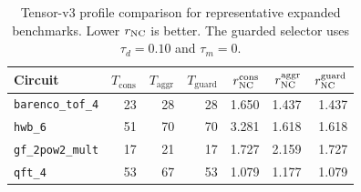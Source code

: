\begin{table}[t]
\caption{Tensor-v3 profile comparison for representative expanded benchmarks. Lower $r_{\mathrm{NC}}$ is better. The guarded selector uses $\tau_d=0.10$ and $\tau_m=0$. }
\label{tab:tensor-v3-guard}
\centering
\small
\begin{tabular}{lrrrrrr}
\toprule
Circuit & $T_{\mathrm{cons}}$ & $T_{\mathrm{aggr}}$ & $T_{\mathrm{guard}}$ & $r_{\mathrm{NC}}^{\mathrm{cons}}$ & $r_{\mathrm{NC}}^{\mathrm{aggr}}$ & $r_{\mathrm{NC}}^{\mathrm{guard}}$\\
\midrule
\texttt{barenco\_tof\_4} & 23 & 28 & 28 & 1.650 & 1.437 & 1.437\\
\texttt{hwb\_6} & 51 & 70 & 70 & 3.281 & 1.618 & 1.618\\
\texttt{gf\_2pow2\_mult} & 17 & 21 & 17 & 1.727 & 2.159 & 1.727\\
\texttt{qft\_4} & 53 & 67 & 53 & 1.079 & 1.177 & 1.079\\
\bottomrule
\end{tabular}
\end{table}
